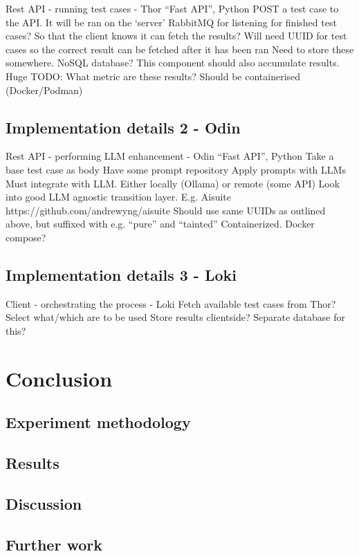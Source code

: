 \documentclass[UKenglish]{uiomasterthesis}  %
\begin{document}
Rest API - running test cases - Thor
“Fast API”, Python
POST a test case to the API. It will be ran on the ‘server’
RabbitMQ for listening for finished test cases? So that the client knows it can fetch the results?
Will need UUID for test cases so the correct result can be fetched after it has been ran
Need to store these somewhere. NoSQL database?
This component should also accumulate results.
Huge TODO: What metric are these results?
Should be containerised (Docker/Podman)

\chapter{Implementation details 2 - Odin}

Rest API - performing LLM enhancement - Odin
“Fast API”, Python
Take a base test case as body
Have some prompt repository
Apply prompts with LLMs
Must integrate with LLM. Either locally (Ollama) or remote (some API)
Look into good LLM agnostic transition layer. E.g. Aisuite
https://github.com/andrewyng/aisuite
Should use same UUIDs as outlined above, but suffixed with e.g. “pure” and “tainted”
Containerized. Docker compose?

\chapter{Implementation details 3 - Loki}

Client - orchestrating the process - Loki
Fetch available test cases from Thor? Select what/which are to be used
Store results clientside? Separate database for this?

\part{Conclusion}
\chapter{Experiment methodology}
\chapter{Results}
\chapter{Discussion}
\chapter{Further work}
\end{document}
